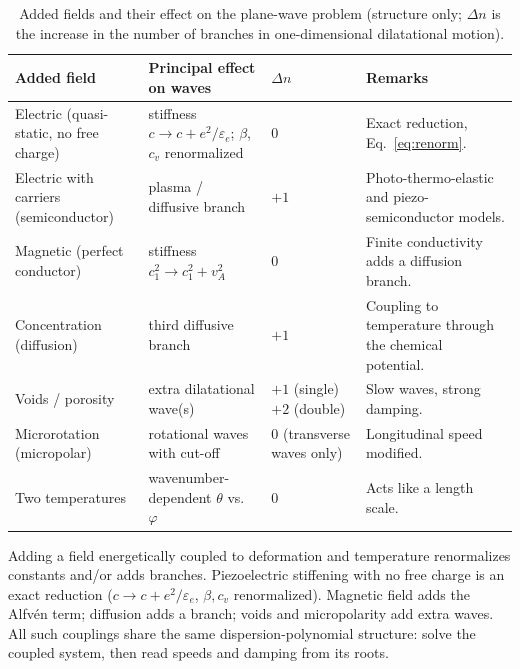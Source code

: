 \begin{table}[t]\centering\small
\caption{Added fields and their effect on the plane-wave problem (structure only; $\Delta n$ is the increase in the number of branches in one-dimensional dilatational motion).}\label{tab:couplings}
\begin{tabularx}{\textwidth}{@{}p{3.1cm}p{3.2cm}p{1.9cm}X@{}}\toprule
Added field & Principal effect on waves & $\Delta n$ & Remarks\\\midrule
Electric (quasi-static, no free charge) & stiffness $c\to c+e^2/\varepsilon_e$; $\beta$, $c_v$ renormalized & 0 & Exact reduction, Eq.~\eqref{eq:renorm}.\\
Electric with carriers (semiconductor) & plasma / diffusive branch & $+1$ & Photo-thermo-elastic and piezo-semiconductor models.\\
Magnetic (perfect conductor) & stiffness $c_1^2\to c_1^2+v_A^2$ & 0 & Finite conductivity adds a diffusion branch.\\
Concentration (diffusion) & third diffusive branch & $+1$ & Coupling to temperature through the chemical potential.\\
Voids / porosity & extra dilatational wave(s) & $+1$ (single) $+2$ (double) & Slow waves, strong damping.\\
Microrotation (micropolar) & rotational waves with cut-off & $0$ (transverse waves only) & Longitudinal speed modified.\\
Two temperatures & wavenumber-dependent $\theta$ vs.\ $\varphi$ & 0 & Acts like a length scale.\\\bottomrule
\end{tabularx}
\end{table}

\begin{summarybox}[Summary]
Adding a field energetically coupled to deformation and temperature renormalizes constants and/or adds branches. Piezoelectric stiffening with no free charge is an exact reduction ($c\to c+e^2/\varepsilon_e$, $\beta,c_v$ renormalized). Magnetic field adds the Alfv\'en term; diffusion adds a branch; voids and micropolarity add extra waves. All such couplings share the same dispersion-polynomial structure: solve the coupled system, then read speeds and damping from its roots.
\end{summarybox}

